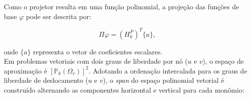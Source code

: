    \vspace{5mm}
    \vspace{5mm}

    \indent Como o projetor resulta em uma função polinomial, a projeção das funções de base $\varphi$ pode ser descrita por: 

    \begin{equation}
        \Pi \varphi = \left( H_k^{P} \right)^T \{a\},
        \label{eq:4.14}
    \end{equation}
    
    \noindent onde $\{a\}$ representa o vetor de coeficientes escalares.\\  
    \indent Em problemas vetoriais com dois graus de liberdade por nó ($u$ e $v$), o espaço de aproximação é $[\mathbb{P}_k(\Omega_v)]^2$. Adotando a ordenação intercalada para os graus de liberdade de deslocamento ($u$ e $v$), o \textit{span} do espaço polinomial vetorial é construído alternando as componentes horizontal e vertical para cada monômio: 

